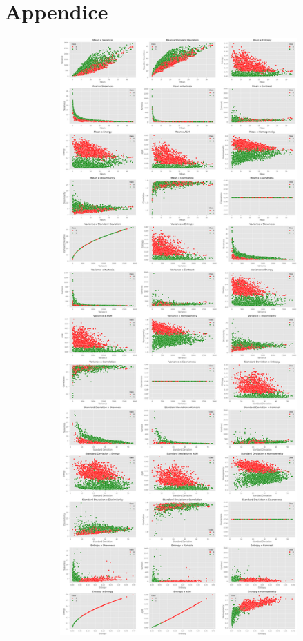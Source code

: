 \chapter*{Appendice}

\begin{figure}[!ht]
    \centering
    \begin{subfigure}{.42\textwidth}
        \centering
        \includegraphics[width=\textwidth]{img/analisi/scatterplot_1.png}

\end{subfigure}
\end{figure}
